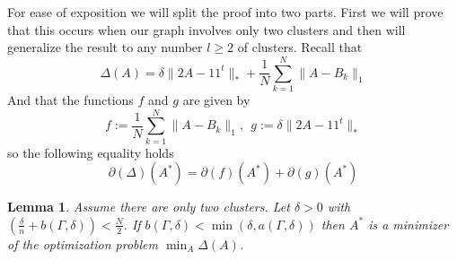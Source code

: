 \documentclass[12pt]{amsart}
\newtheorem{lemma}{Lemma}[section]
\theoremstyle{remark}
\begin{document}
For ease of  exposition we will split the proof into two parts. First we will prove that this occurs when our graph involves only two clusters and then will generalize the result to any number $l\geq 2$ of clusters. 
Recall that 
\[\Delta(A)= \delta\|2A-11^t\|_{*}+\frac{1}{N}\sum_{k=1}^N\|A-B_k\|_1\] 
And that the functions $f$ and $g$ are given by
\[
f:= \frac{1}{N}\sum_{k=1}^N\|A-B_k\|_1, \ \ g:= \delta\|2A-11^t\|_{*}
\]
so the following equality holds
\begin{equation}\label{SumaSubDif}
\partial(\Delta)(A^*) = \partial(f)(A^*)+\partial(g)(A^*)
\end{equation}




\begin{lemma}\label{thm: transport}  Assume there are only two clusters. Let $\delta>0$ with $ \left(\frac{\delta}{n}+b(\Gamma,\delta) \right)  < \frac{N}{2}$. If $b(\Gamma,\delta)< \min(\delta, a(\Gamma,\delta))$ then $A^*$ is a minimizer of the optimization problem $\min_A\Delta(A)$.
\end{lemma} 
\end{document}
